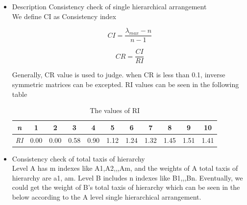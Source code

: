 \documentclass[12pt,a4paper]{article}
\begin{document}
\begin{itemize}
    \item Description Consistency check of single hierarchical arrangement \\
    We define CI as Consistency index
    
    \begin{equation}CI=\!\!\frac{\lambda_{max}-n}{n-1}\end{equation}
    
    
    \begin{equation}CR=\frac{CI}{RI}\end{equation}
    
    Generally, CR value is used to judge. when CR is less than 0.1, inverse symmetric matrices can be excepted. RI values can be seen in the following table
    
    \begin{table}[H] \renewcommand\arraystretch{1.5}
        \begin{center}
            \caption{\footnotesize {The values of RI}}
            \begin{footnotesize}
                \begin{tabular}{ccccccccccc}\toprule[1pt]
                    \it  n & \bf 1    &\bf 2     & \bf 3  & \bf 4   &\bf 5 & \bf 6 & \bf 7 & \bf 8 & \bf 9&\bf 10   \bigstrut\\\hline
                    \it RI & 0.00 &0.00 &0.58 &0.90&1.12&1.24&1.32&1.45&1.51&1.41\bigstrut\\\bottomrule[1pt]
                \end{tabular}
            \end{footnotesize}
        \end{center}
    \end{table}
    \item Consistency check of total taxis of hierarchy \\
    Level A has m indexes like A1,A2,,,Am, and the weights of A total taxis of hierarchy are a1, am. Level B includes n indexes like B1,,,Bn. Eventually, we could get the weight of B's total taxis of hierarchy which can be seen in the below according to the A level single hierarchical arrangement.


\end{itemize}
\end{document}
